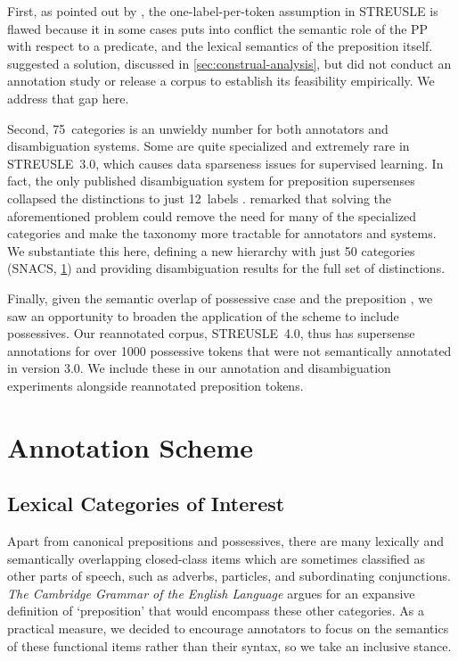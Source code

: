 \pdfoutput=1 \documentclass[11pt,a4paper]{article}
\begin{document}
First, as pointed out by \citet{hwang-17}, the one-label-per-token assumption in STREUSLE is flawed because it in some cases puts into conflict the semantic role of the PP with respect to a predicate, and the lexical semantics of the preposition itself.
 suggested a solution, discussed in \cref{sec:construal-analysis}, 
but did not conduct an annotation study or release a corpus to establish its feasibility empirically. 
We address that gap here.

Second, 75~categories is an unwieldy number for both annotators and disambiguation systems. 
Some are quite specialized and extremely rare in STREUSLE~3.0, which causes data sparseness issues for supervised learning. 
In fact, the only published disambiguation system for preposition supersenses collapsed the distinctions to just 12~labels \citep{gonen-16}.
 remarked that solving the aforementioned problem could remove the need for many of the specialized categories and make the taxonomy more tractable for annotators and systems. 
We substantiate this here, defining a new hierarchy with just 50 categories (SNACS, \cref{sec:scheme}) and providing disambiguation results for the full set of distinctions. 

Finally, given the semantic overlap of possessive case and the preposition , 
we saw an opportunity to broaden the application of the scheme to include possessives. 
Our reannotated corpus, STREUSLE~4.0, thus has supersense annotations for over 1000 possessive tokens that were not semantically annotated in version 3.0.
We include these in our annotation and disambiguation experiments 
alongside reannotated preposition tokens.










\section{Annotation Scheme}\label{sec:scheme}

\subsection{Lexical Categories of Interest}\label{sec:lexcat} 

Apart from canonical prepositions and possessives, there are many lexically and semantically overlapping closed-class items which are sometimes classified as other parts of speech, such as adverbs, particles, and subordinating conjunctions. 
\emph{The Cambridge Grammar of the English Language} \citep{cgel} argues for an expansive definition of `preposition' that would encompass these other categories. 
As a practical measure, we decided to encourage annotators to focus on the semantics of these functional items rather than their syntax, so we take an inclusive stance.
\end{document}
